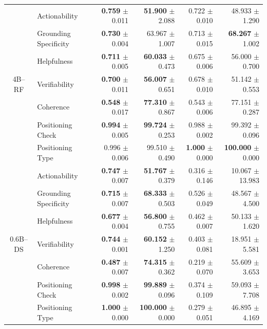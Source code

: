 \begin{table}[!t]
{\begin{tabular*}{\textwidth}{@{\extracolsep{\fill}}clrrrr@{}}
\multirow{7}{*}{4B--RF}
& Actionability & \textbf{0.759} $\pm$ 0.011 & \textbf{51.900} $\pm$ 2.088 & 0.722 $\pm$ 0.010 & 48.933 $\pm$ 1.290 \\
& Grounding Specificity & \textbf{0.730} $\pm$ 0.004 & 63.967 $\pm$ 1.007 & 0.713 $\pm$ 0.015 & \textbf{68.267} $\pm$ 1.002 \\
& Helpfulness & \textbf{0.711} $\pm$ 0.005 & \textbf{60.033} $\pm$ 0.473 & 0.675 $\pm$ 0.006 & 56.000 $\pm$ 0.700 \\
& Verifiability & \textbf{0.700} $\pm$ 0.011 & \textbf{56.007} $\pm$ 0.651 & 0.678 $\pm$ 0.010 & 51.142 $\pm$ 0.553 \\
& Coherence & \textbf{0.548} $\pm$ 0.017 & \textbf{77.310} $\pm$ 0.867 & 0.543 $\pm$ 0.006 & 77.151 $\pm$ 0.287 \\
& Positioning Check & \textbf{0.994} $\pm$ 0.005 & \textbf{99.724} $\pm$ 0.253 & 0.988 $\pm$ 0.002 & 99.392 $\pm$ 0.096 \\
& Positioning Type & 0.996 $\pm$ 0.006 & 99.510 $\pm$ 0.490 & \textbf{1.000} $\pm$ 0.000 & \textbf{100.000} $\pm$ 0.000 \\
\midrule

\multirow{7}{*}{0.6B--DS}
& Actionability & \textbf{0.747} $\pm$ 0.007 & \textbf{51.767} $\pm$ 0.379 & 0.316 $\pm$ 0.146 & 10.067 $\pm$ 13.983 \\
& Grounding Specificity & \textbf{0.715} $\pm$ 0.007 & \textbf{68.333} $\pm$ 0.503 & 0.526 $\pm$ 0.049 & 48.567 $\pm$ 4.500 \\
& Helpfulness & \textbf{0.677} $\pm$ 0.004 & \textbf{56.800} $\pm$ 0.755 & 0.462 $\pm$ 0.007 & 50.133 $\pm$ 1.620 \\
& Verifiability & \textbf{0.744} $\pm$ 0.001 & \textbf{60.152} $\pm$ 1.250 & 0.403 $\pm$ 0.081 & 18.951 $\pm$ 5.581 \\
& Coherence & \textbf{0.487} $\pm$ 0.007 & \textbf{74.315} $\pm$ 0.362 & 0.219 $\pm$ 0.070 & 55.609 $\pm$ 3.653 \\
& Positioning Check & \textbf{0.998} $\pm$ 0.002 & \textbf{99.889} $\pm$ 0.096 & 0.374 $\pm$ 0.109 & 59.093 $\pm$ 7.708 \\
& Positioning Type & \textbf{1.000} $\pm$ 0.000 & \textbf{100.000} $\pm$ 0.000 & 0.279 $\pm$ 0.051 & 46.895 $\pm$ 4.169 \\
\midrule


\end{tabular*}}
\end{table}
